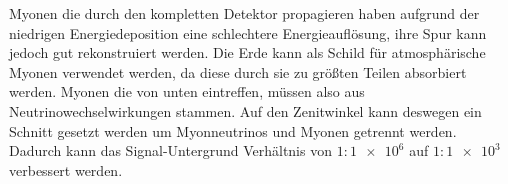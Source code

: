Myonen die durch den kompletten Detektor propagieren haben aufgrund der niedrigen Energiedeposition eine schlechtere Energieaufl\"osung, ihre Spur kann jedoch gut rekonstruiert werden.
Die Erde kann als Schild f\"ur atmosph\"arische Myonen verwendet werden, da diese durch sie zu gr\"o\ss ten Teilen absorbiert werden. Myonen die von unten eintreffen, m\"ussen also aus Neutrinowechselwirkungen stammen.
Auf den Zenitwinkel kann deswegen ein Schnitt gesetzt werden um Myonneutrinos und Myonen getrennt werden. Dadurch kann das Signal-Untergrund Verh\"altnis von $1:\num{1e6}$ auf $1:\num{1e3}$ verbessert werden.

